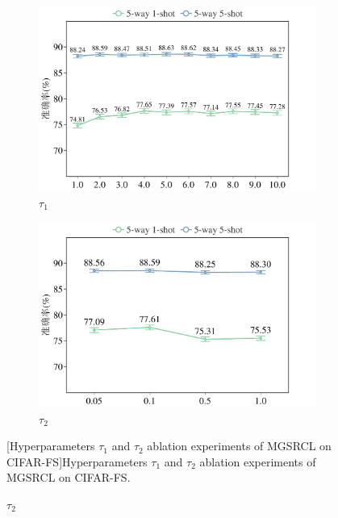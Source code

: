 \begin{figure}[h!]
\centering
{}
\begin{subfigure}{0.495\columnwidth}
\includegraphics[width=\columnwidth]{figures/MGSRCL/CIFAR-FS/t1.pdf}
\caption{$\tau_1$}
\label{figure3: t1(CIFAR-FS)}
\end{subfigure}
\begin{subfigure}{0.495\columnwidth}
\includegraphics[width=\columnwidth]{figures/MGSRCL/CIFAR-FS/t2.pdf}
\caption{$\tau_2$}
\label{figure3: t2(CIFAR-FS)}
\end{subfigure}
[Hyperparameters $\tau_1$ and $\tau_2$ ablation experiments of MGSRCL on CIFAR-FS]{Hyperparameters $\tau_1$ and $\tau_2$ ablation experiments of MGSRCL on CIFAR-FS.}
\label{figure3: t1 and t2 (CIFAR-FS)}
\end{figure}

